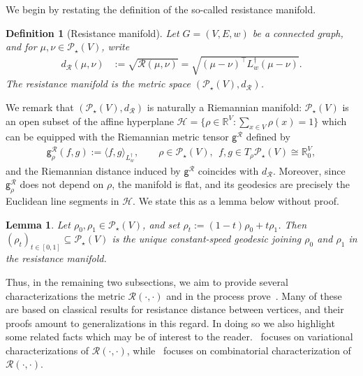 \documentclass[11pt,a4paper]{article}
\newcommand{\Resis}{\mathcal{R}}
\newcommand{\Prob}{\mathscr{P}}
\newtheorem{definition}[theorem]{Definition}
\newtheorem{lemma}[theorem]{Lemma}
\begin{document}
We begin by restating the definition of the so-called resistance manifold.

\begin{definition}[Resistance manifold]\label{defn:resistance-manifold}
    Let $G=(V,E,w)$ be a connected graph, and for $\mu,\nu\in\Prob_\star(V)$, write
        \begin{align}\label{eq:distance-resis}
            d_\Resis(\mu,\nu) &:= \sqrt{\Resis(\mu,\nu)} = \sqrt{(\mu-\nu)^\top L_w^\dagger (\mu-\nu)}.
        \end{align}
    The \emph{resistance manifold} is the metric space $(\Prob_\star(V), d_\Resis)$. 
\end{definition}

We remark that $(\Prob_\star(V), d_\Resis)$ is naturally a Riemannian manifold: $\Prob_\star(V)$ is an open subset of the affine hyperplane $\mathcal{H}=\{\rho\in\mathbb{R}^V:\sum_{x\in V}\rho(x)=1\}$ which can be equipped with the Riemannian metric tensor $\mathsf{g}^\Resis$ defined by
    \begin{align}\label{eq:resistance-inner-product}
        \mathsf{g}^\Resis_\rho(f, g) := \langle f, g\rangle_{L_{w}^\dagger},\qquad \rho\in\Prob_\star(V),\ \ f, g\in T_\rho\Prob_\star(V)\cong \mathbb{R}^V_0,
    \end{align}
and the Riemannian distance induced by $\mathsf{g}^\Resis$ coincides with $d_\Resis$. Moreover, since $\mathsf{g}^\Resis_\rho$ does not depend on $\rho$, the manifold is flat, and its geodesics are precisely the Euclidean line segments in $\mathcal{H}$. We state this as a lemma below without proof.

\begin{lemma}\label{lem:resistance-geodesics}
    Let $\rho_0,\rho_1\in\Prob_\star(V)$, and set $\rho_t := (1-t)\rho_0+t\rho_1$. Then $(\rho_t)_{t\in[0,1]}\subseteq\Prob_\star(V)$ is the unique constant-speed geodesic joining $\rho_0$ and $\rho_1$ in the resistance manifold.
\end{lemma}

Thus, in the remaining two subsections, we aim to provide several characterizations the metric $\Resis(\cdot,\cdot)$ and in the process prove~. Many of these are based on classical results for resistance distance between vertices, and their proofs amount to generalizations in this regard. In doing so we also highlight some related facts which may be of interest to the reader.~ focuses on variational characterizations of $\Resis(\cdot,\cdot)$, while~ focuses on combinatorial characterization of $\Resis(\cdot,\cdot)$.
\end{document}
